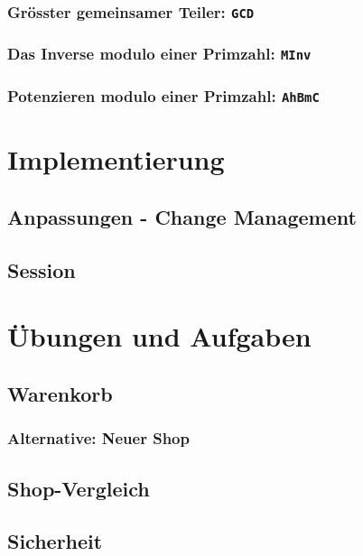 \subsubsection*{Grösster gemeinsamer Teiler: \texttt{GCD}}
\subsubsection*{Das Inverse modulo einer Primzahl: \texttt{MInv}}
\subsubsection*{Potenzieren modulo einer Primzahl: \texttt{AhBmC}}

\section{Implementierung}

\subsection{Anpassungen - Change Management}

\subsection{Session}

\section{Übungen und Aufgaben}

\subsection{Warenkorb}
\subsubsection*{Alternative: Neuer Shop}

\subsection{Shop-Vergleich}

\subsection{Sicherheit}
